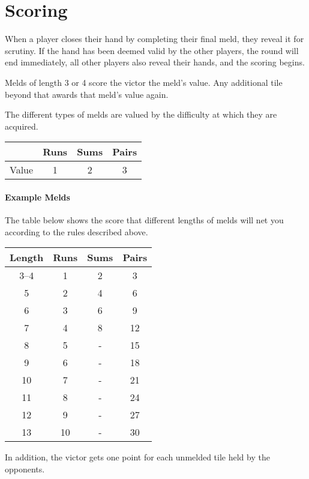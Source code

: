 \section{Scoring}\label{sec:scoring}
When a player closes their hand by completing their final meld, they reveal it for scrutiny. 
If the hand has been deemed valid by the other players, the round will end immediately, all other players also reveal their hands, and the scoring begins.

Melds of length 3 or 4 score the victor the meld's value. Any additional tile beyond that awards that meld's value again.

The different types of melds are valued by the difficulty at which they are acquired.

\begin{center}
    \begin{tabular}{c||c|c|c}
              & Runs & Sums & Pairs\\\hline\hline
        Value & 1 & 2 & 3\\
    \end{tabular}
\end{center}

\paragraph{Example Melds}
The table below shows the score that different lengths of melds will net you according to the rules described above.
\begin{center}
    \begin{tabular}{c||c|c|c}
        Length & Runs & Sums & Pairs\\\hline\hline
        3--4 & 1 &  2 &  3 \\
           5 & 2 &  4 &  6 \\
           6 & 3 &  6 &  9 \\
           7 & 4 &  8 & 12 \\
           8 & 5 &  - & 15 \\
           9 & 6 &  - & 18 \\
          10 & 7 &  - & 21 \\
          11 & 8 &  - & 24 \\
          12 & 9 &  - & 27 \\
          13 &10 &  - & 30 \\ 
    \end{tabular}
\end{center}
In addition, the victor gets one point for each unmelded tile held by the opponents.

